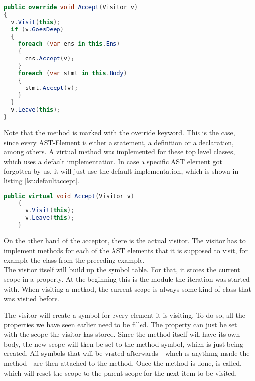 \begin{lstlisting}[language=csharp, caption={Accepting a Visitor}, captionpos=b, label={lst:visitoraccept}]
public override void Accept(Visitor v)
{
  v.Visit(this);
  if (v.GoesDeep)
  {
    foreach (var ens in this.Ens)
    {
      ens.Accept(v);
    }
    foreach (var stmt in this.Body)
    {
      stmt.Accept(v);
    }
  }
  v.Leave(this);
}
\end{lstlisting}

Note that the method is marked with the override keyword.
This is the case, since every AST-Element is either a statement, a definition or a declaration, among others.
A virtual  method was implemented for these top level classes, which uses a default implementation.
In case a specific AST element got forgotten by us, it will just use the default implementation, which is shown in listing \ref{lst:defaultaccept}.

\begin{lstlisting}[language=csharp, caption={Default Accept}, captionpos=b, label={lst:defaultaccept}]
    public virtual void Accept(Visitor v)
    {
      v.Visit(this);
      v.Leave(this);
    }
\end{lstlisting}

On the other hand of the acceptor, there is the actual visitor.
The visitor has to implement  methods for each of the AST elements
that it is supposed to visit, for example the class  from the preceding example.\\

The visitor itself will build up the symbol table.
For that, it stores the current scope in a property.
At the beginning this is the module the iteration was started with.
When visiting a method, the current scope is always some kind of class that was visited before.

The visitor will create a symbol for every element it is visiting.
To do so, all the properties we have seen earlier need to be filled.
The property  can just be set with the scope the visitor has stored.
Since the method itself will have its own body, the new scope will then be set to the method-symbol, which is just being created.
All symbols that will be visited afterwards - which is anything inside the method - are then attached to the method.
Once the method is done,  is called, which will reset the scope to the parent scope for the next item to be visited.\\


